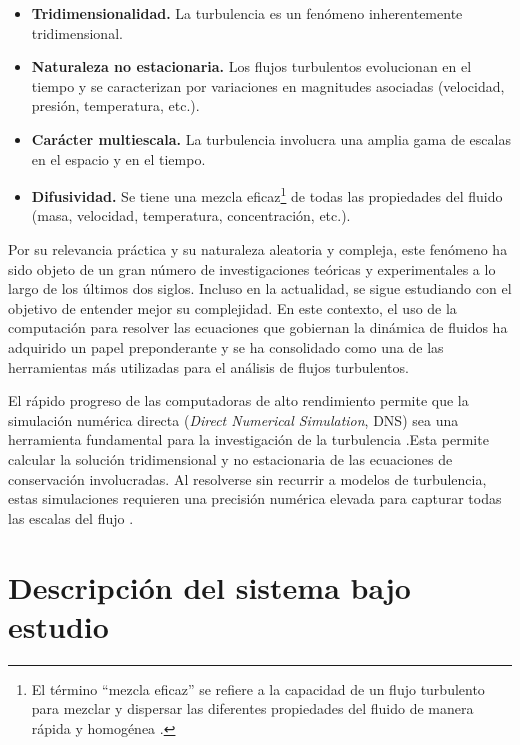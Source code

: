 \begin{itemize}
	
	\item \textbf{Tridimensionalidad.} La turbulencia es un fenómeno inherentemente tridimensional. 
	
	\item \textbf{Naturaleza no estacionaria.} Los flujos turbulentos evolucionan en el tiempo y se caracterizan por variaciones en magnitudes asociadas (velocidad, presión, temperatura, etc.).
	
	\item \textbf{Carácter multiescala.} La turbulencia involucra una amplia gama de escalas en el espacio y en el tiempo. 
	
	\item \textbf{Difusividad.} Se tiene una mezcla eficaz\footnote{El término ``mezcla eficaz'' se refiere a la capacidad de un flujo turbulento para mezclar y dispersar las diferentes propiedades del fluido de manera rápida y homogénea \cite{pope2001turbulent}.} de todas las propiedades del fluido (masa, velocidad, temperatura, concentración, etc.).

\end{itemize}

Por su relevancia práctica y su naturaleza aleatoria y compleja, este fenómeno ha sido objeto de un gran número de investigaciones teóricas y experimentales a lo largo de los últimos dos siglos. Incluso en la actualidad, se sigue estudiando con el objetivo de entender mejor su complejidad. En este contexto, el uso de la computación para resolver las ecuaciones que gobiernan la dinámica de fluidos ha adquirido un papel preponderante y se ha consolidado como una de las herramientas más utilizadas para el análisis de flujos turbulentos.

El rápido progreso de las computadoras de alto rendimiento permite que la \linebreak simulación numérica directa (\textit{Direct Numerical Simulation}, DNS) sea una herramienta fundamental para la investigación de la turbulencia \cite{moin1998direct}.{\linebreak}Esta permite calcular la solución tridimensional y no estacionaria de las ecuaciones de conservación involucradas. Al resolverse sin recurrir a modelos de turbulencia, estas simulaciones requieren una precisión numérica elevada para capturar todas las escalas del flujo \cite{pope2001turbulent}.

\section{Descripción del sistema bajo estudio} \label{sec:descripcion}

